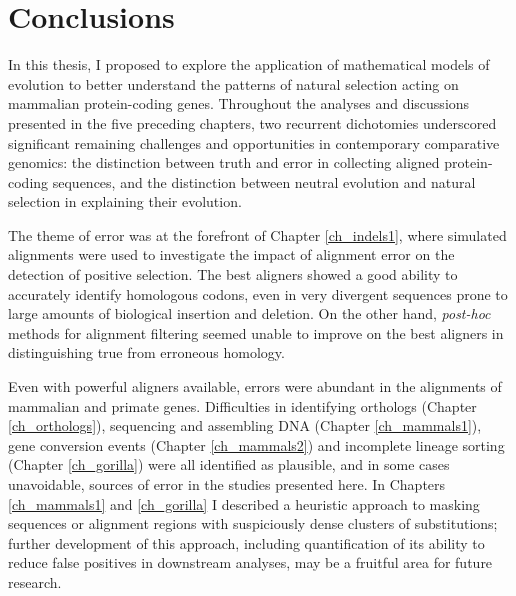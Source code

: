 \chapter{Conclusions}
\label{ch_conclusions}
\acresetall

In this thesis, I proposed to explore the application of mathematical
models of evolution to better understand the patterns of natural
selection acting on mammalian protein-coding genes. Throughout the
analyses and discussions presented in the five preceding chapters, two
recurrent dichotomies underscored significant remaining challenges and
opportunities in contemporary comparative genomics: the distinction
between truth and error in collecting aligned protein-coding
sequences, and the distinction between neutral evolution and natural
selection in explaining their evolution.

The theme of error was at the forefront of Chapter \ref{ch_indels1},
where simulated alignments were used to investigate the impact of
alignment error on the detection of \sw positive selection. The best
aligners showed a good ability to accurately identify homologous
codons, even in very divergent sequences prone to large amounts of
biological insertion and deletion. On the other hand, \emph{post-hoc}
methods for alignment filtering seemed unable to improve on the best
aligners in distinguishing true from erroneous homology.

Even with powerful aligners available, errors were abundant in the
alignments of mammalian and primate genes. Difficulties in identifying
orthologs (Chapter \ref{ch_orthologs}), sequencing and assembling DNA
(Chapter \ref{ch_mammals1}), gene conversion events (Chapter
\ref{ch_mammals2}) and incomplete lineage sorting (Chapter
\ref{ch_gorilla}) were all identified as plausible, and in some cases
unavoidable, sources of error in the studies presented here. In
Chapters \ref{ch_mammals1} and \ref{ch_gorilla} I described a
heuristic approach to masking sequences or alignment regions with
suspiciously dense clusters of \nsyn substitutions; further
development of this approach, including quantification of its ability
to reduce false positives in downstream analyses, may be a fruitful
area for future research.

